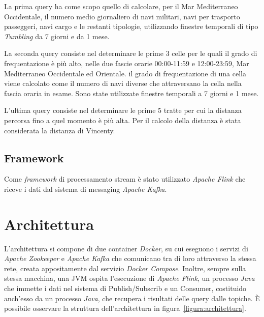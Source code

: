 \documentclass[conference]{IEEEtran}
\begin{document}
\par La prima query ha come scopo quello di calcolare, per il Mar Mediterraneo Occidentale, il numero medio giornaliero  di navi militari, navi per trasporto passeggeri, navi cargo e le restanti tipologie, utilizzando finestre temporali di tipo \emph{Tumbling} da 7 giorni e da 1 mese.

\par La seconda query consiste nel determinare le prime 3 celle per le quali il grado di frequentazione \`{e} pi\`{u} alto, nelle due fascie orarie 00:00-11:59 e 12:00-23:59, Mar Mediterraneo Occidentale ed Orientale. il grado di frequentazione di una cella viene calcolato come il numero di navi diverse che attraversano la cella nella fascia oraria in esame. Sono state utilizzate finestre temporali a 7 giorni e 1 mese.

\par L'ultima query consiste nel determinare le prime 5 tratte per cui la distanza percorsa fino a quel momento \`{e} pi\`{u} alta. Per il calcolo della distanza è stata considerata la distanza di Vincenty.

\subsection*{\textbf{Framework}}
Come \emph{framework} di processamento stream \`{e} stato utilizzato \emph{Apache Flink} che riceve i dati dal sistema di messaging \emph{Apache Kafka}. 

\section{\textbf{Architettura}}
L'architettura si compone di due container \emph{Docker}, su cui eseguono i servizi di \emph{Apache Zookeeper} e \emph{Apache Kafka} che comunicano tra di loro attraverso la stessa rete, creata appositamente dal servizio \emph{Docker Compose}. Inoltre, sempre sulla stessa macchina, una JVM ospita l'esecuzione di \emph{Apache Flink}, un processo \emph{Java} che immette i dati nel sistema di Publish/Subscrib e un Consumer, costituido anch'esso da un processo \emph{Java}, che recupera i risultati delle query dalle topiche.
\`{E} possibile osservare la struttura dell'architettura in figura~\ref{figura:architettura}.
\end{document}
